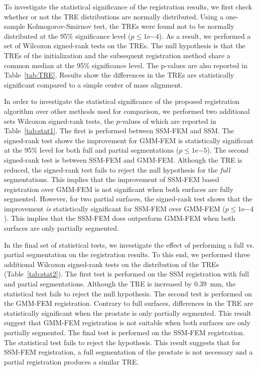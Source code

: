 \documentclass[journal]{IEEEtran}
\newcommand{\eng}[2]{#1\mathrm{e}{#2}}
\begin{document}
To investigate the statistical significance of the registration results, we first check whether or not the TRE distributions are normally distributed. Using a one-sample Kolmogorov-Smirnov test, the TREs were found not to be normally distributed at the 95\% significance level ($p\leq\eng{1}{-4}$). As a result, we performed a set of Wilcoxon signed-rank tests on the TREs. The null hypothesis is that the TREs of the initialization and the subsequent registration method share a common median at the 95\% significance level. The p-values are also reported in Table~\ref{tab:TRE}. Results show the differences in the TREs are statistically significant compared to a simple center of mass alignment. 

In order to investigate the statistical significance of the proposed registration algorithm over other methods used for comparison, we performed two additional sets Wilcoxon signed-rank tests, the $p$-values of which are reported in Table~\ref{tab:stat1}. The first is performed between SSM-FEM and SSM. The signed-rank test shows the improvement for GMM-FEM is statistically significant at the 95\% level for both full and partial segmentations ($p\leq\eng{1}{-5}$). The second signed-rank test is between SSM-FEM and GMM-FEM. Although the TRE is reduced, the signed-rank test fails to reject the null hypothesis for the \emph{full} segmentations. This implies that the improvement of SSM-FEM based registration over GMM-FEM is not significant when both surfaces are fully segmented. However, for two partial surfaces, the signed-rank test shows that the improvement \emph{is} statistically significant for SSM-FEM over GMM-FEM ($p\leq\eng{1}{-4}$). This implies that the SSM-FEM does outperform GMM-FEM when both surfaces are only partially segmented.

In the final set of statistical tests, we investigate the effect of performing a full vs. partial segmentation on the registration results. To this end, we performed three additional Wilcoxon signed-rank tests on the distribution of the TREs (Table~\ref{tab:stat2}). The first test is performed on the SSM registration with full and partial segmentations. Although the TRE is increased by $0.39$~mm, the statistical test fails to reject the null hypothesis. The second test is performed on the GMM-FEM registration. Contrary to full surfaces, differences in the TRE are statistically significant when the prostate is only partially segmented. This result suggest that GMM-FEM registration is not suitable when both surfaces are only partially segmented. The final test is performed on the SSM-FEM registration. The statistical test fails to reject the hypothesis. This result suggests that for SSM-FEM registration, a full segmentation of the prostate is not necessary and a partial registration produces a similar TRE.
\end{document}
